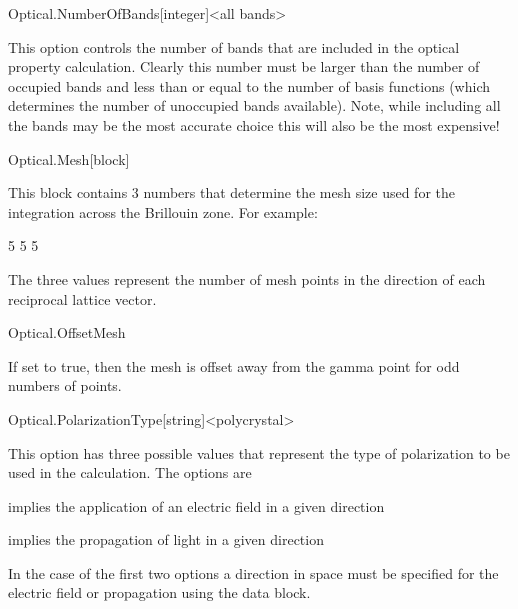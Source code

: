 \begin{fdfentry}{Optical.NumberOfBands}[integer]<all bands>
  
  This option controls the number of bands that are included in the
  optical property calculation. Clearly this number must be larger
  than the number of occupied bands and less than or equal to the
  number of basis functions (which determines the number of unoccupied
  bands available). Note, while including all the bands may be the
  most accurate choice this will also be the most expensive!

\end{fdfentry}

\begin{fdfentry}{Optical.Mesh}[block]

  This block contains 3 numbers that determine the mesh size used for
  the integration across the Brillouin zone. For example:
  \begin{fdfexample}
        5 5 5
  \end{fdfexample}
  The three values represent the number of mesh points in the
  direction of each reciprocal lattice vector.

\end{fdfentry}


\begin{fdflogicalF}{Optical.OffsetMesh}
  
  If set to true, then the mesh is offset away from the gamma point
  for odd numbers of points.

\end{fdflogicalF}

\begin{fdfentry}{Optical.PolarizationType}[string]<polycrystal>

  This option has three possible values that represent the type of
  polarization to be used in the calculation. The options are
  \begin{fdfoptions}
    \option[polarized]%
    implies the application of an electric field in a given direction

    \option[unpolarized]%
    implies the propagation of light in a given direction

    \option[polycrystal]%
    In the case of the first two options a direction in space must be
    specified for the electric field or propagation using the
     data block.

  \end{fdfoptions}
  
\end{fdfentry}


